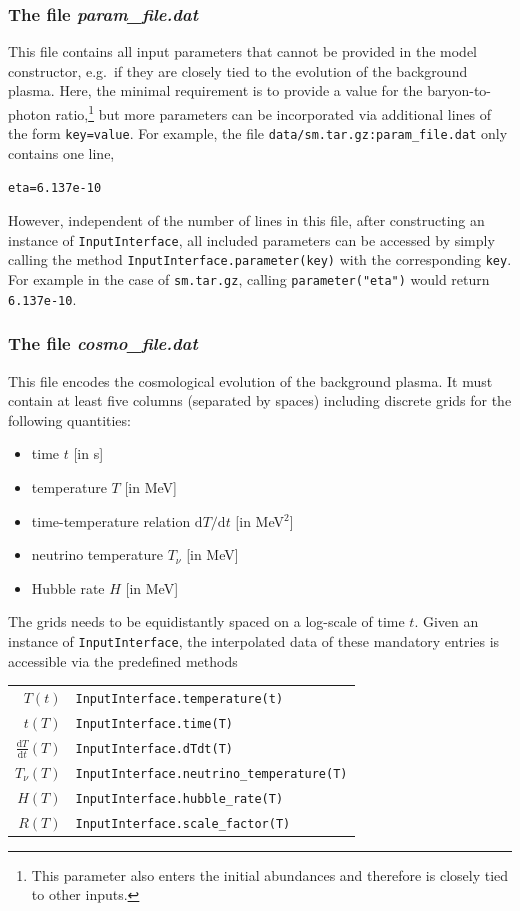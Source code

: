 \documentclass[11pt,a4paper]{article}
\begin{document}
\subsubsection{The file \textit{param\_file.dat}}
This file contains all input parameters that cannot be provided in the model constructor, e.g.\ if they are closely tied to the evolution of the background plasma. Here, the minimal requirement is to provide a value for the baryon-to-photon ratio,\footnote{This parameter also enters the initial abundances and therefore is closely tied to other inputs.} but more parameters can be incorporated via additional lines of the form \texttt{key=value}. For example, the file \texttt{data/sm.tar.gz:param\_file.dat} only contains one line,
\begin{lstlisting}[backgroundcolor=\color{white}]
eta=6.137e-10
\end{lstlisting}
However, independent of the number of lines in this file, after constructing an instance of \texttt{InputInterface}, all included parameters can be accessed by simply calling the method \texttt{InputInterface.parameter(key)} with the corresponding \texttt{key}. For example in the case of \texttt{sm.tar.gz}, calling \texttt{parameter("eta")} would return \texttt{6.137e-10}.

\subsubsection{The file \textit{cosmo\_file.dat}}
This file encodes the cosmological evolution of the background plasma. It must contain at least five columns (separated by spaces) including discrete grids for the following quantities:
\begin{itemize}
\item time $t$ [in s]
\item temperature $T$ [in MeV]
\item time-temperature relation $\text{d}T/\text{d}t$ [in MeV$^2$]
\item neutrino temperature $T_\nu$ [in MeV]
\item Hubble rate $H$ [in MeV]
\end{itemize}
The grids needs to be equidistantly spaced on a log-scale of time $t$. Given an instance of \texttt{InputInterface}, the interpolated data of these mandatory entries is accessible via the predefined methods
\begin{center}
\begin{tabular}{rl}
	$T(t)$ & \texttt{InputInterface.temperature(t)} \\[0.2cm]
	$t(T)$ & \texttt{InputInterface.time(T)} \\[0.2cm]
	$\frac{\text{d}T}{\text{d}t}(T)$ & \texttt{InputInterface.dTdt(T)} \\[0.2cm]
	$T_\nu(T)$ & \texttt{InputInterface.neutrino\_temperature(T)} \\[0.2cm]
	$H(T)$ & \texttt{InputInterface.hubble\_rate(T)} \\[0.2cm]
	$R(T)$ & \texttt{InputInterface.scale\_factor(T)} \\[0.2cm]
\end{tabular}
\end{center}
\end{document}
